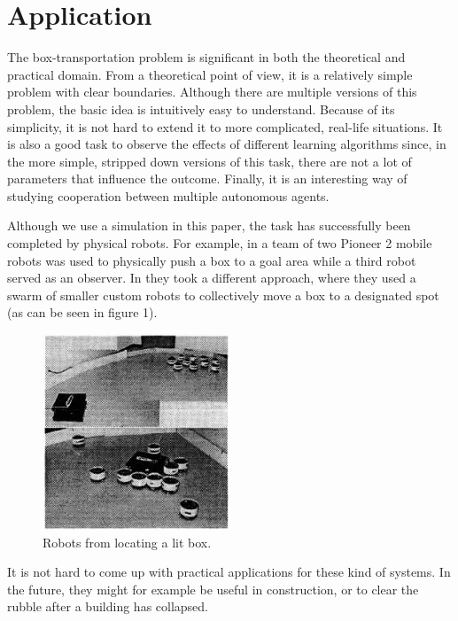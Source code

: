 \section{Application}
The box-transportation problem is significant in both the theoretical and practical domain. From a theoretical point of view, it is a relatively simple problem with clear boundaries. Although there are multiple versions of this problem, the basic idea is intuitively easy to understand. Because of its simplicity, it is not hard to extend it to more complicated, real-life situations. It is also a good task to observe the effects of different learning algorithms since, in the more simple, stripped down versions of this task, there are not a lot of parameters that influence the outcome. Finally, it is an interesting way of studying cooperation between multiple autonomous agents.

 Although we use a simulation in this paper, the task has successfully been completed by physical robots. For example, in \cite{mataric2002} a team of two Pioneer 2 mobile robots was used to physically push a box to a goal area while a third robot served as an observer. In \cite{kube1996} they took a different approach, where they used a swarm of smaller custom robots to collectively move a box to a designated spot (as can be seen in figure 1).
\begin{figure}
	\centering
	\includegraphics[width = 0.5\textwidth]{images/swarmPushing.png}
	\caption{Robots from \cite{kube1996} locating a lit box.}
	\label{fig:robots}
\end{figure}
It is not hard to come up with practical applications for these kind of systems. In the future, they might for example be useful in construction, or to clear the rubble after a building has collapsed.\\

